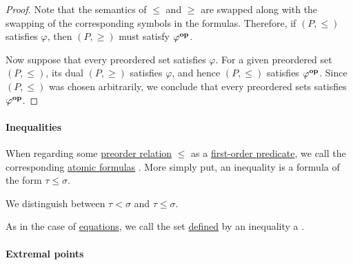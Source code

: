\begin{proof}
  Note that the semantics of \( \leq \) and \( \geq \) are swapped along with the swapping of the corresponding symbols in the formulas. Therefore, if \( (P, \leq) \) satisfies \( \varphi \), then \( (P, \geq) \) must satisfy \( \varphi^\oppos \).

  Now suppose that every preordered set satisfies \( \varphi \). For a given preordered set \( (P, \leq) \), its dual \( (P, \geq) \) satisfies \( \varphi \), and hence \( (P, \leq) \) satisfies \( \varphi^\oppos \). Since \( (P, \leq) \) was chosen arbitrarily, we conclude that every preordered sets satisfies \( \varphi^\oppos \).
\end{proof}

\paragraph{Inequalities}

\begin{definition}\label{def:inequality}\mimprovised
  When regarding some \hyperref[def:preordered_set]{preorder relation} \( \leq \) as a \hyperref[def:first_order_language/pred]{first-order predicate}, we call the corresponding \hyperref[def:first_order_syntax/atomic_formula]{atomic formulas} . More simply put, an inequality is a formula of the form \( \tau \leq \sigma \).

  We distinguish between  \( \tau < \sigma \) and  \( \tau \leq \sigma \).

  As in the case of \hyperref[def:equation]{equations}, we call the set \hyperref[def:first_order_definability]{defined} by an inequality a .
\end{definition}

\paragraph{Extremal points}

